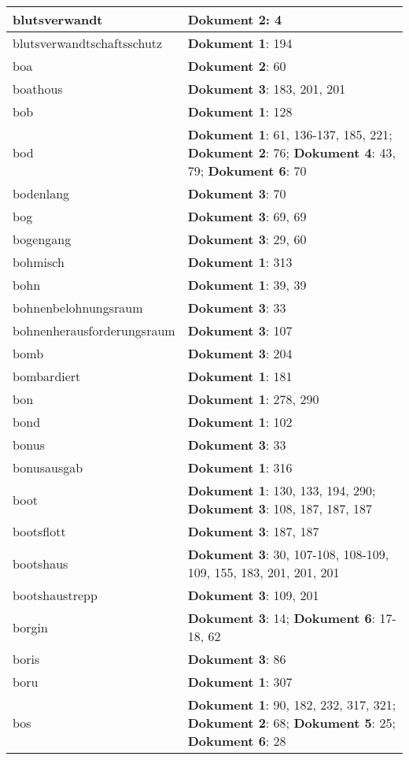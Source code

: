 \documentclass[a5paper]{article}
\begin{document}
\begin{longtable}[l]{|l|p{3in}|}
\hline
blutsverwandt & \textbf{Dokument 2}: 4 \\
\hline
blutsverwandtschaftsschutz & \textbf{Dokument 1}: 194 \\
\hline
boa & \textbf{Dokument 2}: 60 \\
\hline
boathous & \textbf{Dokument 3}: 183, 201, 201 \\
\hline
bob & \textbf{Dokument 1}: 128 \\
\hline
bod & \textbf{Dokument 1}: 61, 136-137, 185, 221; \textbf{Dokument 2}: 76; \textbf{Dokument 4}: 43, 79; \textbf{Dokument 6}: 70 \\
\hline
bodenlang & \textbf{Dokument 3}: 70 \\
\hline
bog & \textbf{Dokument 3}: 69, 69 \\
\hline
bogengang & \textbf{Dokument 3}: 29, 60 \\
\hline
bohmisch & \textbf{Dokument 1}: 313 \\
\hline
bohn & \textbf{Dokument 1}: 39, 39 \\
\hline
bohnenbelohnungsraum & \textbf{Dokument 3}: 33 \\
\hline
bohnenherausforderungsraum & \textbf{Dokument 3}: 107 \\
\hline
bomb & \textbf{Dokument 3}: 204 \\
\hline
bombardiert & \textbf{Dokument 1}: 181 \\
\hline
bon & \textbf{Dokument 1}: 278, 290 \\
\hline
bond & \textbf{Dokument 1}: 102 \\
\hline
bonus & \textbf{Dokument 3}: 33 \\
\hline
bonusausgab & \textbf{Dokument 1}: 316 \\
\hline
boot & \textbf{Dokument 1}: 130, 133, 194, 290; \textbf{Dokument 3}: 108, 187, 187, 187 \\
\hline
bootsflott & \textbf{Dokument 3}: 187, 187 \\
\hline
bootshaus & \textbf{Dokument 3}: 30, 107-108, 108-109, 109, 155, 183, 201, 201, 201 \\
\hline
bootshaustrepp & \textbf{Dokument 3}: 109, 201 \\
\hline
borgin & \textbf{Dokument 3}: 14; \textbf{Dokument 6}: 17-18, 62 \\
\hline
boris & \textbf{Dokument 3}: 86 \\
\hline
boru & \textbf{Dokument 1}: 307 \\
\hline
bos & \textbf{Dokument 1}: 90, 182, 232, 317, 321; \textbf{Dokument 2}: 68; \textbf{Dokument 5}: 25; \textbf{Dokument 6}: 28 \\

\end{longtable}
\end{document}
